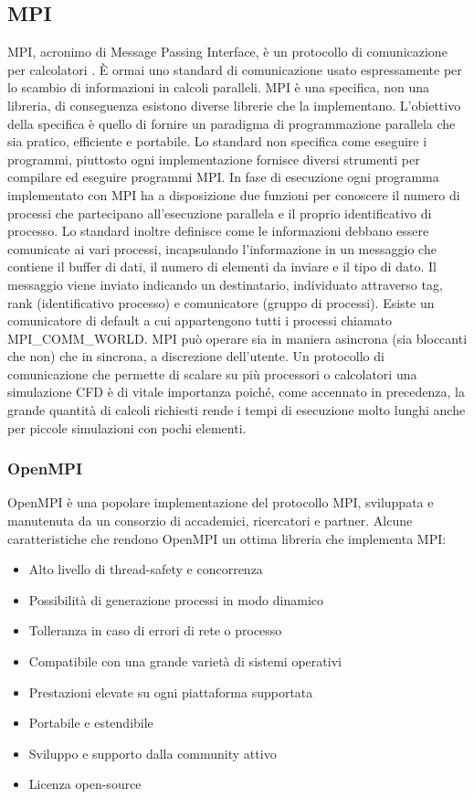     \subsection{MPI}
    MPI, acronimo di Message Passing Interface, è un protocollo di comunicazione per calcolatori \cite{10.5555/898758}. È ormai
    uno standard di comunicazione usato espressamente per lo scambio di informazioni in calcoli paralleli.
    MPI è una specifica, non una libreria, di conseguenza esistono diverse librerie che la implementano.
    L'obiettivo della specifica è quello di fornire un paradigma di programmazione parallela che sia pratico,
    efficiente e portabile. Lo standard non specifica come eseguire i programmi, piuttosto ogni implementazione
    fornisce diversi strumenti per compilare ed eseguire programmi MPI. In fase di esecuzione ogni programma
    implementato con MPI ha a disposizione due funzioni per conoscere il numero di processi che partecipano
    all'esecuzione parallela e il proprio identificativo di processo. Lo standard inoltre definisce come
    le informazioni debbano essere comunicate ai vari processi, incapsulando l'informazione in un messaggio
    che contiene il buffer di dati, il numero di elementi da inviare e il tipo di dato. Il messaggio viene
    inviato indicando un destinatario, individuato attraverso tag, rank (identificativo processo) e
    comunicatore (gruppo di processi). Esiste un comunicatore di default a cui appartengono tutti i processi
    chiamato MPI\_COMM\_WORLD. MPI può operare sia in maniera asincrona (sia bloccanti che non) che in sincrona, a discrezione dell'utente.
    Un protocollo di comunicazione che permette di scalare su più processori o calcolatori una simulazione CFD
    è di vitale importanza poiché, come accennato in precedenza, la grande quantità di calcoli richiesti
    rende i tempi di esecuzione molto lunghi anche per piccole simulazioni con pochi elementi.
        \subsubsection{OpenMPI}
        OpenMPI è una popolare implementazione del protocollo MPI, sviluppata e manutenuta da un consorzio
        di accademici, ricercatori e partner. Alcune caratteristiche che rendono OpenMPI un ottima libreria
        che implementa MPI:

        \begin{itemize}
            \item Alto livello di thread-safety e concorrenza
            \item Possibilità di generazione processi in modo dinamico
            \item Tolleranza in caso di errori di rete o processo
            \item Compatibile con una grande varietà di sistemi operativi
            \item Prestazioni elevate su ogni piattaforma supportata
            \item Portabile e estendibile
            \item Sviluppo e supporto dalla community attivo
            \item Licenza open-source
        \end{itemize}

